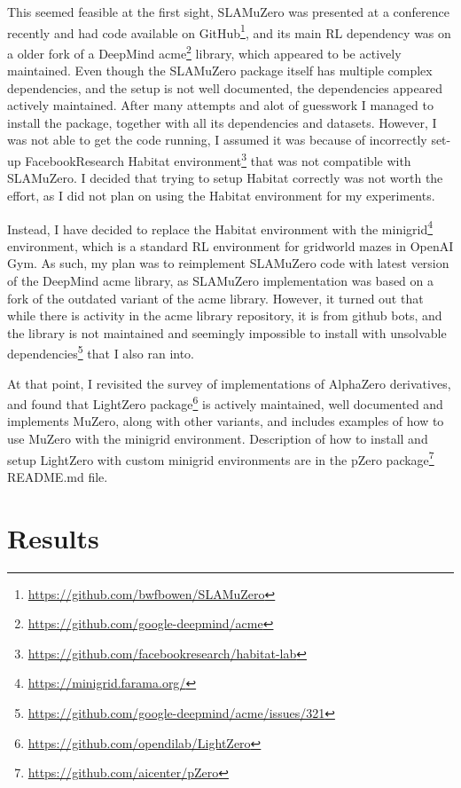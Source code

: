 \documentclass[12pt]{article}
\begin{document}
This seemed feasible at the first sight, SLAMuZero was presented at a conference recently and had code available on GitHub\footnote{\url{https://github.com/bwfbowen/SLAMuZero}}, and its main RL dependency was on a older fork of a DeepMind acme\footnote{\url{https://github.com/google-deepmind/acme}} library, which appeared to be actively maintained. Even though the SLAMuZero package itself has multiple complex dependencies, and the setup is not well documented, the dependencies appeared actively maintained. After many attempts and alot of guesswork I managed to install the package, together with all its dependencies and datasets. However, I was not able to get the code running, I assumed it was because of incorrectly set-up FacebookResearch Habitat environment\footnote{\url{https://github.com/facebookresearch/habitat-lab}} that was not compatible with SLAMuZero. I decided that trying to setup Habitat correctly was not worth the effort, as I did not plan on using the Habitat environment for my experiments.

Instead, I have decided to replace the Habitat environment with the minigrid\footnote{\url{https://minigrid.farama.org/}} environment, which is a standard RL environment for gridworld mazes in OpenAI Gym. As such, my plan was to reimplement SLAMuZero code with latest version of the DeepMind acme library, as SLAMuZero implementation was based on a fork of the outdated variant of the acme library. However, it turned out that while there is activity in the acme library repository, it is from github bots, and the library is not maintained and seemingly impossible to install with unsolvable dependencies\footnote{\url{https://github.com/google-deepmind/acme/issues/321}} that I also ran into.

At that point, I revisited the survey of implementations of AlphaZero derivatives, and found that LightZero package\footnote{\url{https://github.com/opendilab/LightZero}} is actively maintained, well documented and implements MuZero, along with other variants, and includes examples of how to use MuZero with the minigrid environment. Description of how to install and setup LightZero with custom minigrid environments are in the pZero package\footnote{\url{https://github.com/aicenter/pZero}} README.md file.

\section{Results}

\printbibliography
\end{document}
